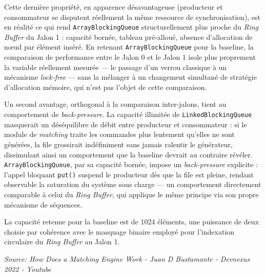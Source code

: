 Cette dernière propriété, en apparence désavantageuse (producteur et consommateur se disputent réellement la même ressource de synchronisation), est en réalité ce qui rend \texttt{ArrayBlockingQueue} structurellement plus proche du \textit{Ring Buffer} du Jalon 1 : capacité bornée, tableau pré-alloué, absence d'allocation de nœud par élément inséré. En retenant \texttt{ArrayBlockingQueue} pour la baseline, la comparaison de performance entre le Jalon 0 et le Jalon 1 isole plus proprement la variable réellement mesurée --- le passage d'un verrou classique à un mécanisme \textit{lock-free} --- sans la mélanger à un changement simultané de stratégie d'allocation mémoire, qui n'est pas l'objet de cette comparaison.

Un second avantage, orthogonal à la comparaison inter-jalons, tient au comportement de \textit{back-pressure}. La capacité illimitée de \texttt{LinkedBlockingQueue} masquerait un déséquilibre de débit entre producteur et consommateur : si le module de \textit{matching} traite les commandes plus lentement qu'elles ne sont générées, la file grossirait indéfiniment sans jamais ralentir le générateur, dissimulant ainsi un comportement que la baseline devrait au contraire révéler. \texttt{ArrayBlockingQueue}, par sa capacité bornée, impose un \textit{back-pressure} explicite : l'appel bloquant \texttt{put()} suspend le producteur dès que la file est pleine, rendant observable la saturation du système sous charge --- un comportement directement comparable à celui du \textit{Ring Buffer}, qui applique le même principe via son propre mécanisme de séquences.

La capacité retenue pour la baseline est de 1024 éléments, une puissance de deux choisie par cohérence avec le masquage binaire employé pour l'indexation circulaire du \textit{Ring Buffer} au Jalon 1.

\textit{Source: How Does a Matching Engine Work - Juan D Bustamante - Devnexus 2022 - Youtube}
